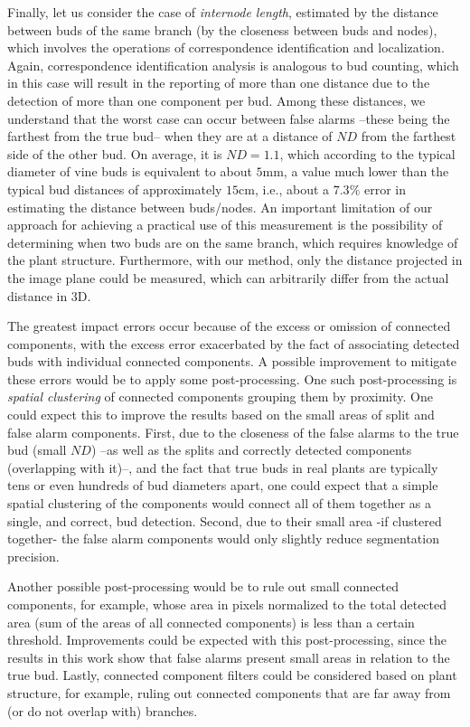 \documentclass[a4paper,authoryear,review]{elsarticle}
\begin{document}
	Finally, let us consider the case of \emph{internode length}, estimated by the distance between buds of the same branch (by the closeness between buds and nodes), which involves the operations of correspondence identification and localization. Again, correspondence identification analysis is analogous to bud counting, which in this case will result in the reporting of more than one distance due to the detection of more than one component per bud. Among these distances, we understand that the worst case can occur between false alarms --these being the farthest from the true bud-- when they are at a distance of $ND$ from the farthest side of the other bud. On average, it is $ND = 1.1$, which according to the typical diameter of vine buds is equivalent to about $5$mm, a value much lower than the typical bud distances of approximately $15$cm, i.e., about a $7.3\%$ error in estimating the distance between buds/nodes. 
	An important limitation of our approach for achieving a practical use of this measurement is the possibility of determining when two buds are on the same branch, which requires knowledge of the plant structure. Furthermore, with our method, only the distance projected in the image plane could be measured, which can arbitrarily differ from the actual distance in 3D. 
	
	The greatest impact errors occur because of the excess or omission of connected components, with the excess error exacerbated by the fact of associating detected buds with individual connected components. A possible improvement to mitigate these errors would be to apply some post-processing. 
	One such post-processing is \emph{spatial clustering} of connected components grouping them by proximity. One could expect this to improve the results based on the small areas of split and false alarm components. First, due to the closeness of the false alarms to the true bud  (small $ND$) --as well as the splits and correctly detected components (overlapping with it)--,  and the fact that true buds in real plants are typically tens or even hundreds of bud diameters apart, one could expect that a simple spatial clustering of the components would connect all of them together as a single, and correct, bud detection. Second, due to their small area -if clustered together- the false alarm components would only slightly reduce segmentation precision.
	
	Another possible post-processing would be to rule out small connected components, for example, whose area in pixels normalized to the total detected area (sum of the areas of all connected components) is less than a certain threshold. Improvements could be expected with this post-processing, since the results in this work show that false alarms present small areas in relation to the true bud. Lastly, connected component filters could be considered based on plant structure, for example, ruling out connected components that are far away from (or do not overlap with) branches.
	
\end{document}

